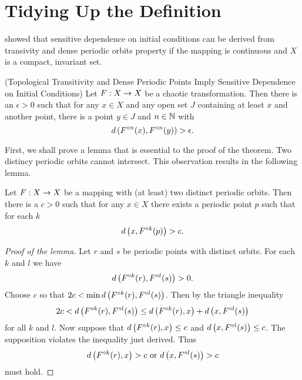 \documentclass[12pt,draft,twoside]{article}
\begin{document}
\section{Tidying Up the Definition}
\citet{banks} showed that sensitive dependence on initial conditions can be derived from transivity and dense periodic orbits property if the mapping is continuous and $X$ is a compact, invariant set. 

\begin{theorem}
  (Topological Transitivity and Dense Periodic Points Imply Sensitive Dependence on Initial Conditions)
  Let $F: X\rightarrow X$ be a chaotic transformation. Then there is an $\epsilon > 0$ such that
  for any $x\in X$ and any open set $J$ containing at least $x$ and another point, there is
  a point $y\in J$ and $n\in \mathbb{N}$ with
  \begin{equation*}
    d\left( F^{\circ n}(x),F^{\circ n}(y) \right) > \epsilon.
  \end{equation*}
  \label{thm:banks}
\end{theorem}
First, we shall prove a lemma that is essential to the proof of the theorem.
Two distincy periodic orbits cannot intersect.
This observation results in the following lemma.
\begin{lemma}
  Let $F: X\rightarrow X$ be a mapping with (at least) two distinct periodic orbits.
  Then there is a $c > 0$ such that for any $x\in X$ there exists a periodic
  point $p$ such that for each $k$
  \begin{equation*}
    d\left( x, F^{\circ k}(p) \right) > c.
  \end{equation*}
  \label{lem:dev1}
\begin{proof}[Proof of the lemma]
  Let $r$ and $s$ be periodic points with distinct orbits. For each $k$ and $l$ we have
  \begin{equation*}
    d\left( F^{\circ k}(r), F^{\circ l}(s) \right) > 0.
  \end{equation*}
  Choose $c$ so that $2c < \min d\left( F^{\circ k}(r),F^{\circ l}(s) \right)$.
  Then by the triangle inequality
  \begin{equation*}
    2c < d\left( F^{\circ k}(r),F^{\circ l}(s) \right) \leq d\left( F^{\circ k}(r),x \right) + d\left( x,F^{\circ l}(s) \right)
  \end{equation*}
  for all $k$ and $l$.
  Now suppose that $d\left( F^{\circ k}(r),x \right) \leq c$ and $d\left( x,F^{\circ l}(s) \right) \leq c$. The supposition
  violates the inequality just derived. Thus 
  \begin{equation*}
    d\left( F^{\circ k}(r),x \right) > c \mbox{ or } d\left( x,F^{\circ l}(s) \right) > c
  \end{equation*}
  must hold.
\end{proof}
\end{lemma}
\end{document}
